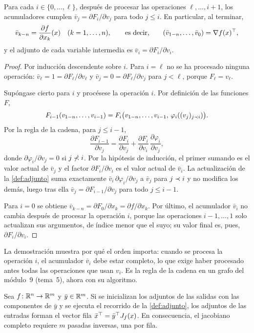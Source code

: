 \begin{teorema}\label{teo:inverso}
Para cada $i\in\{0,\dots,\ell\}$, después de procesar las operaciones $\ell,\dots,i+1$, los acumuladores cumplen $\bar v_j=\partial F_i/\partial v_j$ para todo $j\le i$. En particular, al terminar,
\[
\bar v_{k-n}=\frac{\partial f}{\partial x_k}(x)\quad(k=1,\dots,n),\qquad\text{es decir,}\qquad(\bar v_{1-n},\dots,\bar v_0)=\nabla f(x)^{\top} ,
\]
y el adjunto de cada variable intermedia es $\bar v_i=\partial F_i/\partial v_i$.
\end{teorema}

\begin{proof}
Por inducción descendente sobre $i$. Para $i=\ell$ no se ha procesado ninguna operación: $\bar v_\ell=1=\partial F_\ell/\partial v_\ell$ y $\bar v_j=0=\partial F_\ell/\partial v_j$ para $j<\ell$, porque $F_\ell=v_\ell$.

Supóngase cierto para $i$ y procésese la operación $i$. Por definición de las funciones $F$,
\[
F_{i-1}(v_{1-n},\dots,v_{i-1})=F_i\bigl(v_{1-n},\dots,v_{i-1},\,\varphi_i((v_j)_{j\prec i})\bigr).
\]
Por la regla de la cadena, para $j\le i-1$,
\[
\frac{\partial F_{i-1}}{\partial v_j}=\frac{\partial F_i}{\partial v_j}+\frac{\partial F_i}{\partial v_i}\,\frac{\partial\varphi_i}{\partial v_j},
\]
donde $\partial\varphi_i/\partial v_j=0$ si $j\not\prec i$. Por la hipótesis de inducción, el primer sumando es el valor actual de $\bar v_j$ y el factor $\partial F_i/\partial v_i$ es el valor actual de $\bar v_i$. La actualización de la \cref{def:adjunto} suma exactamente $\bar v_i\,\partial\varphi_i/\partial v_j$ a $\bar v_j$ para $j\prec i$ y no modifica los demás, luego tras ella $\bar v_j=\partial F_{i-1}/\partial v_j$ para todo $j\le i-1$.

Para $i=0$ se obtiene $\bar v_{k-n}=\partial F_0/\partial x_k=\partial f/\partial x_k$. Por último, el acumulador $\bar v_i$ no cambia después de procesar la operación $i$, porque las operaciones $i-1,\dots,1$ solo actualizan sus argumentos, de índice menor que el suyo; su valor final es, pues, $\partial F_i/\partial v_i$.
\end{proof}

La demostración muestra por qué el orden importa: cuando se procesa la operación $i$, el acumulador $\bar v_i$ debe estar completo, lo que exige haber procesado antes todas las operaciones que usan $v_i$. Es la regla de la cadena en un grafo del módulo~9 (tema~5), ahora con su algoritmo.

\begin{proposicion}\label{prop:vjp}
Sea $f\colon\mathbb{R}^{n}\to\mathbb{R}^{m}$ y $\bar y\in\mathbb{R}^{m}$. Si se inicializan los adjuntos de las salidas con las componentes de $\bar y$ y se ejecuta el recorrido de la \cref{def:adjunto}, los adjuntos de las entradas forman el vector fila $\bar x^{\top}=\bar y^{\top} J_f(x)$. En consecuencia, el jacobiano completo requiere $m$ pasadas inversas, una por fila.
\end{proposicion}

